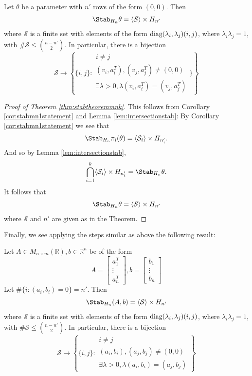 \documentclass[11pt,letterpaper]{amsart}
\begin{document}
\begin{corollary}\label{cor:stabmn1statement}
    Let $\theta$ be a parameter with $n'$ rows of the form $(0, 0).$ Then 
    $$
    \Stab_{H_n}\theta = \langle \mathcal{S} \rangle \times H_{n'}
    $$
    where $\mathcal{S}$ is a finite set with elements of the form $\textup{diag}(\lambda_i, \lambda_j) (i, j)$, where $\lambda_i\lambda_j=1$, with $\#\mathcal{S} \leq \binom{n-n'}{2}$. In particular, there is a bijection
    $$
    \mathcal{S}\longrightarrow \left\{\{i, j\}: \begin{split}
        i\neq j\\ (v_i, a_i^T), (v_j, a_j^T)\neq (0,0)\\ \exists \lambda>0, \lambda (v_i, a_i^T)=(v_j, a_j^T)
    \end{split}\}\right\}
    $$
\end{corollary}
\begin{proof}[Proof of Theorem \ref{thm:stabtheoremmnk}]
    This follows from Corollary \ref{cor:stabmn1statement} and Lemma \ref{lem:intersectionstab}: By Corollary \ref{cor:stabmn1statement} we see that
    $$
    \Stab_{H_n}\pi_i(\theta) = \langle \mathcal{S}_i \rangle \times H_{n_{i}'}.
    $$
    And so by Lemma \ref{lem:intersectionstab},
    $$
    \bigcap_{i=1}^{k} \langle \mathcal{S}_i \rangle \times H_{n_{i}'} = \Stab_{H_n}\theta.
    $$
    It follows that 
    $$
    \Stab_{H_n}\theta = \langle \mathcal{S} \rangle \times H_{n'}
    $$
    where $\mathcal{S}$ and $n'$ are given as in the Theorem.
\end{proof}
Finally, we see applying the steps similar as above the following result:
\begin{lemma}\label{lem:StabOmegaPrimeCase}
    Let $A\in M_{n\times m}(\mathbb{R}), b\in \mathbb{R}^n$ be of the form
    $$
    A = \begin{bmatrix}
        a_1^T \\ \vdots \\ a_n^T
    \end{bmatrix}, b= \begin{bmatrix}
        b_1 \\ \vdots \\ b_n
    \end{bmatrix}
    $$
Let $\#\{i: (a_i,b_i)= 0\}=n'$. Then 
    $$
    \Stab_{H_n} (A,b) = \langle \mathcal{S}\rangle \times H_{n'}
    $$
    where $\mathcal{S}$ is a finite set with elements of the form $\textup{diag}(\lambda_i, \lambda_j) (i, j)$, where $\lambda_i\lambda_j=1$, with $\#\mathcal{S} \leq \binom{n-n'}{2}$. In particular, there is a bijection
    $$
    \mathcal{S}\longrightarrow \left\{\{i, j\}: \begin{split}
        i\neq j\\ (a_i, b_i), (a_j, b_j)\neq (0,0)\\ \exists \lambda>0, \lambda (a_i, b_i)=(a_j, b_j)
    \end{split}\right\}
    $$
\end{lemma}
\end{document}
